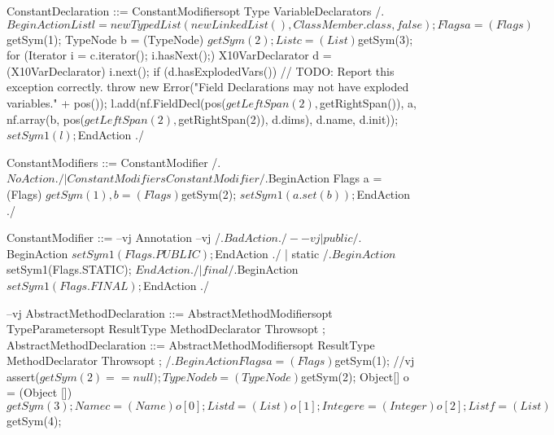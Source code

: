     ConstantDeclaration ::= ConstantModifiersopt Type VariableDeclarators
        /.$BeginAction
                    List l = new TypedList(new LinkedList(), ClassMember.class, false);
                    Flags a = (Flags) $getSym(1);
                    TypeNode b = (TypeNode) $getSym(2);
                    List c = (List) $getSym(3);
                    for (Iterator i = c.iterator(); i.hasNext();)
                    {
                        X10VarDeclarator d = (X10VarDeclarator) i.next();
                        if (d.hasExplodedVars())
                          // TODO: Report this exception correctly.
                          throw new Error("Field Declarations may not have exploded variables." + pos());
                        l.add(nf.FieldDecl(pos($getLeftSpan(2), $getRightSpan()),
                                           a,
                                           nf.array(b, pos($getLeftSpan(2), $getRightSpan(2)), d.dims),
                                           d.name,
                                           d.init));
                    }
                    $setSym1(l);
          $EndAction
        ./
    
    ConstantModifiers ::= ConstantModifier
        /.$NoAction./
                        | ConstantModifiers ConstantModifier
        /.$BeginAction
                    Flags a = (Flags) $getSym(1),
                          b = (Flags) $getSym(2);
                    $setSym1(a.set(b));
          $EndAction
        ./
    
    ConstantModifier ::= 
--vj Annotation
--vj        /.$BadAction./
--vj                       | 
                            public
        /.$BeginAction
                    $setSym1(Flags.PUBLIC);
          $EndAction
        ./
                       | static
        /.$BeginAction
                    $setSym1(Flags.STATIC);
          $EndAction
        ./
                       | final
        /.$BeginAction
                    $setSym1(Flags.FINAL);
          $EndAction
        ./
    
--vj    AbstractMethodDeclaration ::= AbstractMethodModifiersopt TypeParametersopt ResultType MethodDeclarator Throwsopt ;
    AbstractMethodDeclaration ::= AbstractMethodModifiersopt  ResultType MethodDeclarator Throwsopt ;
        /.$BeginAction
                    Flags a = (Flags) $getSym(1);
//vj                    assert($getSym(2) == null);
                    TypeNode b = (TypeNode) $getSym(2);
                    Object[] o = (Object []) $getSym(3);
                        Name c = (Name) o[0];
                        List d = (List) o[1];
                        Integer e = (Integer) o[2];
                    List f = (List) $getSym(4);

